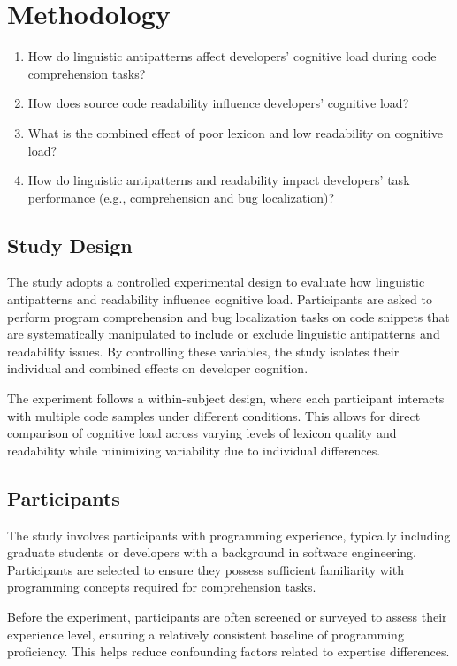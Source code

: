 \section{Methodology}
\begin{enumerate}[leftmargin=*, itemsep=0.3em, label=\textbf{RQ \arabic*.}]
    \item How do linguistic antipatterns affect developers' cognitive load during code comprehension tasks?
    \item How does source code readability influence developers' cognitive load?
    \item What is the combined effect of poor lexicon and low readability on cognitive load?
    \item How do linguistic antipatterns and readability impact developers' task performance (e.g., comprehension and bug localization)?
\end{enumerate}

\subsection{Study Design}
The study adopts a controlled experimental design to evaluate how linguistic antipatterns and readability influence cognitive load. Participants are asked to perform program comprehension and bug localization tasks on code snippets that are systematically manipulated to include or exclude linguistic antipatterns and readability issues. By controlling these variables, the study isolates their individual and combined effects on developer cognition.

The experiment follows a within-subject design, where each participant interacts with multiple code samples under different conditions. This allows for direct comparison of cognitive load across varying levels of lexicon quality and readability while minimizing variability due to individual differences.

\subsection{Participants}
The study involves participants with programming experience, typically including graduate students or developers with a background in software engineering. Participants are selected to ensure they possess sufficient familiarity with programming concepts required for comprehension tasks.

Before the experiment, participants are often screened or surveyed to assess their experience level, ensuring a relatively consistent baseline of programming proficiency. This helps reduce confounding factors related to expertise differences.

